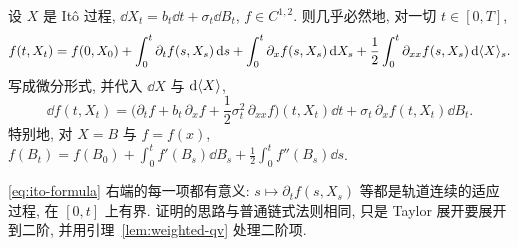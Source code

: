 \begin{theorem}[It\^o 公式]\label{thm:ito-formula}
设 $X$ 是 It\^o 过程, $\dd X_t=b_t\dd t+\sigma_t\dd B_t$, $f\in C^{1,2}$. 则几乎必然地, 对一切 $t\in[0,T]$,
\begin{equation}\label{eq:ito-formula}
f(t,X_t)=f(0,X_0)+\int_0^t\partial_tf(s,X_s)\mathop{}\!\mathrm{d} s+\int_0^t\partial_xf(s,X_s)\mathop{}\!\mathrm{d} X_s+\frac{1}{2}\int_0^t\partial_{xx}f(s,X_s)\mathop{}\!\mathrm{d}\langle X\rangle_s.
\end{equation}
写成微分形式, 并代入 $\dd X$ 与 $\mathop{}\!\mathrm{d}\langle X\rangle$,
\[
\dd f(t,X_t)=\Big(\partial_tf+b_t\,\partial_xf+\frac{1}{2}\sigma_t^2\,\partial_{xx}f\Big)(t,X_t)\dd t+\sigma_t\,\partial_xf(t,X_t)\dd B_t.
\]
特别地, 对 $X=B$ 与 $f=f(x)$, $f(B_t)=f(B_0)+\int_0^tf'(B_s)\dd B_s+\frac{1}{2}\int_0^tf''(B_s)\dd s$.
\end{theorem}

\eqref{eq:ito-formula} 右端的每一项都有意义: $s\mapsto\partial_tf(s,X_s)$ 等都是轨道连续的适应过程, 在 $[0,t]$ 上有界. 证明的思路与普通链式法则相同, 只是 Taylor 展开要展开到二阶, 并用引理~\ref{lem:weighted-qv} 处理二阶项.

